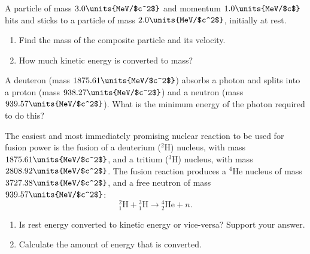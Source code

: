 \begin{problem}
  A particle of mass $3.0\units{MeV/$c^2$}$ and momentum
  $1.0\units{MeV/$c$}$ hits and sticks to a particle of mass
  $2.0\units{MeV/$c^2$}$, initially at rest.
  \begin{enumerate}
  \item Find the mass of the composite particle and its velocity.
  \item How much kinetic energy is converted to mass?
  \end{enumerate}
\label{prob:composite}
\end{problem}

\begin{problem}
  A deuteron (mass $1875.61\units{MeV/$c^2$}$) absorbs a photon and
  splits into a proton (mass $938.27\units{MeV/$c^2$}$) and a neutron
  (mass $939.57\units{MeV/$c^2$}$).  What is the minimum energy of the
  photon required to do this?
  \label{prob:deuteron}
\end{problem}

\newpage
\begin{problem}
%
%
The easiest and most immediately promising nuclear reaction to be used for
fusion power is the fusion of a deuterium ($^2$H) nucleus, with mass 
$1875.61\units{MeV/$c^2$}$, and a tritium ($^3$H) nucleus, with mass 
$2808.92\units{MeV/$c^2$}$.  The fusion reaction produces a $^4$He
nucleus of mass $3727.38\units{MeV/$c^2$}$,  and a free neutron of 
mass $939.57\units{MeV/$c^2$}$:
\[ {^2_1\mbox{H}} + {^3_1\mbox{H}} \rightarrow  {^4_2\mbox{He}} + n.\]
\begin{enumerate}
\item Is rest energy converted to kinetic energy or vice-versa?
Support your answer.
\item Calculate the amount of energy that is converted.
\end{enumerate}
\label{prob:fusion}
\end{problem}



